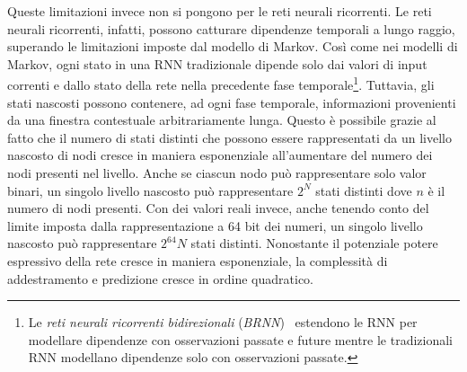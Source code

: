 Queste limitazioni invece non si pongono per le reti neurali ricorrenti.
Le reti neurali ricorrenti, infatti, possono catturare dipendenze temporali a lungo raggio, superando le limitazioni imposte dal modello di Markov.
Cos\`i come nei modelli di Markov, ogni stato in una RNN tradizionale dipende solo dai valori di input correnti e dallo stato della rete nella precedente fase temporale\footnote{Le \emph{reti neurali ricorrenti bidirezionali} (\emph{BRNN})~\cite{Schuster:1997} estendono le RNN per modellare dipendenze con osservazioni passate e future mentre le tradizionali RNN modellano dipendenze solo con osservazioni passate.}.
Tuttavia, gli stati nascosti possono contenere, ad ogni fase temporale, informazioni provenienti da una finestra contestuale arbitrariamente lunga.
Questo \`e possibile grazie al fatto che il numero di stati distinti che possono essere rappresentati da un livello nascosto di nodi cresce in maniera esponenziale all'aumentare del numero dei nodi presenti nel livello.
Anche se ciascun nodo pu\`o rappresentare solo valor binari, un singolo livello nascosto pu\`o rappresentare $2^N$ stati distinti dove $n$ \`e il numero di nodi presenti.
Con dei valori reali invece, anche tenendo conto del limite imposta dalla rappresentazione a 64 bit dei numeri, un singolo livello nascosto pu\`o rappresentare $2^64N$ stati distinti.
Nonostante il potenziale potere espressivo della rete cresce in maniera esponenziale, la complessit\`a di addestramento e predizione cresce in ordine quadratico.

